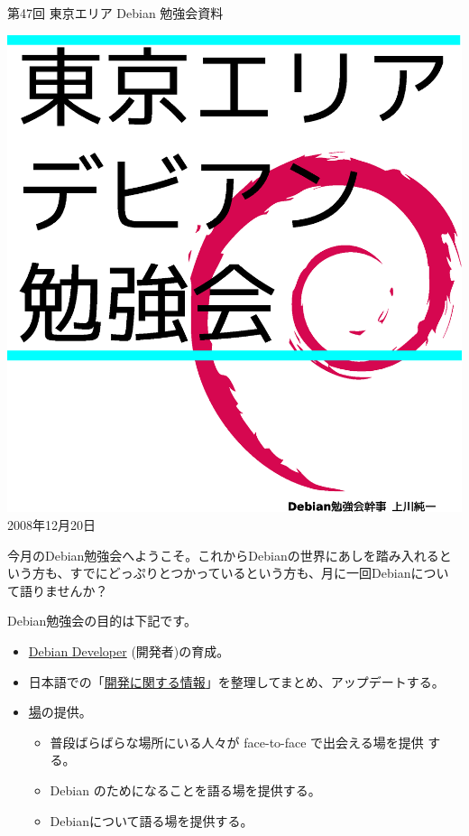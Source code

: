 \documentclass[mingoth,a4paper]{jsarticle}
\newcommand{\debmtgyear}{2008}
\newcommand{\debmtgmonth}{12}
\newcommand{\debmtgdate}{20}
\newcommand{\debmtgnumber}{47}
\begin{document}
\begin{titlepage}
\thispagestyle{empty}


\vspace*{-2cm}
第\debmtgnumber{}回 東京エリア Debian 勉強会資料

\hspace*{-2.4cm}
\includegraphics[width=210mm]{image200801/2008title.eps}\\
\hfill{}\debmtgyear{}年\debmtgmonth{}月\debmtgdate{}日

\end{titlepage}

 
 今月のDebian勉強会へようこそ。これからDebianの世界にあしを踏み入れると
 いう方も、すでにどっぷりとつかっているという方も、月に一回Debianについ
 て語りませんか？

 Debian勉強会の目的は下記です。

\begin{itemize}
 \item \underline{Debian Developer} (開発者)の育成。
 \item 日本語での「\underline{開発に関する情報}」を整理してまとめ、アップデートする。
 \item \underline{場}の提供。
 \begin{itemize}
  \item 普段ばらばらな場所にいる人々が face-to-face で出会える場を提供
	する。
  \item Debian のためになることを語る場を提供する。
  \item Debianについて語る場を提供する。
 \end{itemize}
\end{itemize}		
\end{document}
